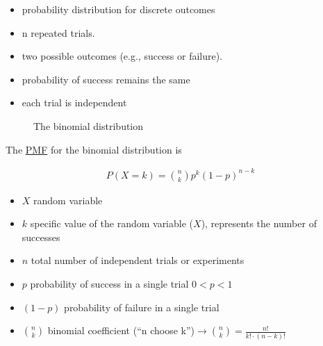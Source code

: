 \documentclass[
  a4paper,
]{scrbook}
\providecommand{\tightlist}{%
  \setlength{\itemsep}{0pt}\setlength{\parskip}{0pt}}\usepackage{longtable,booktabs,array}
\begin{document}
\begin{itemize}
\item
  probability distribution for discrete outcomes
\item
  n repeated trials.
\item
  two possible outcomes (e.g., success or failure).
\item
  probability of success remains the same
\item
  each trial is independent
\end{itemize}

\begin{figure}[ht]


\caption{\label{fig-bn-dist-slides}The binomial distribution}

\end{figure}%

The \hyperref[acronyms_PMF]{PMF} for the binomial distribution is

\begin{align}
P(X = k) = \binom{n}{k} p^k (1 - p)^{n - k} \nonumber
\end{align}

\begin{itemize}
\tightlist
\item
  \(X\) random variable
\item
  \(k\) specific value of the random variable (\(X\)), represents the
  number of successes
\item
  \(n\) total number of independent trials or experiments
\item
  \(p\) probability of success in a single trial \(0<p<1\)
\item
  \((1 - p)\) probability of failure in a single trial
\item
  \(\binom{n}{k}\) binomial coefficient (``n choose
  k'')\(\rightarrow \binom{n}{k} = \frac{n!}{k! \cdot (n - k)!}\)
\end{itemize}
\end{document}
